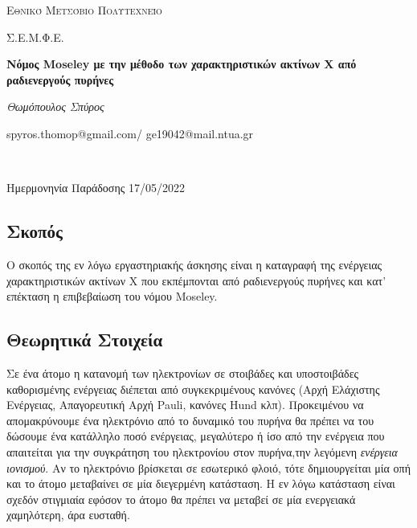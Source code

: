 \documentclass[a4paper]{article}
\begin{document}
\begin{titlepage}			%
	\centering
	{\scshape\LARGE Εθνικό Μετσόβιο Πολυτεχνείο\par}
	{\scshape \LARGE Σ.Ε.Μ.Φ.Ε.\par}
	\vspace{1cm}
	{\huge\bfseries Νόμος Moseley με την μέθοδο των χαρακτηριστικών ακτίνων Χ από ραδιενεργούς πυρήνες\par}
	\vspace{1cm}
	{\Large\itshape Θωμόπουλος Σπύρος\par}		%
	
	{\large spyros.thomop@gmail.com/ ge19042@mail.ntua.gr\par \hfill \\}%
	\vspace{1cm}
	{\large Ημερμονηνία Παράδοσης 17/05/2022\par}
\end{titlepage}

\subsection*{Σκοπός}
	Ο σκοπός της εν λόγω εργαστηριακής άσκησης είναι η καταγραφή της ενέργειας χαρακτηριστικών ακτίνων Χ που εκπέμπονται από ραδιενεργούς πυρήνες και κατ' επέκταση η επιβεβαίωση του νόμου Moseley.


\subsection*{Θεωρητικά Στοιχεία}
	
	Σε ένα άτομο η κατανομή των ηλεκτρονίων σε στοιβάδες και υποστοιβάδες καθορισμένης ενέργειας διέπεται από συγκεκριμένους κανόνες (Αρχή Ελάχιστης Ενέργειας, Απαγορευτική Αρχή Pauli, κανόνες Hund κλπ). Προκειμένου να απομακρύνουμε ένα ηλεκτρόνιο από το δυναμικό του πυρήνα θα πρέπει να του δώσουμε ένα κατάλληλο ποσό ενέργειας, μεγαλύτερο ή ίσο από την ενέργεια που απαιτείται για την συγκράτηση του ηλεκτρονίου στον πυρήνα,την λεγόμενη \textit{ενέργεια ιονισμού}. Αν το ηλεκτρόνιο βρίσκεται σε εσωτερικό φλοιό, τότε δημιουργείται μία οπή και το άτομο μεταβαίνει σε μία διεγερμένη κατάσταση. Η εν λόγω κατάσταση είναι σχεδόν στιγμιαία εφόσον το άτομο θα πρέπει να μεταβεί σε μία ενεργειακά χαμηλότερη, άρα ευσταθή.
	
\end{document}
